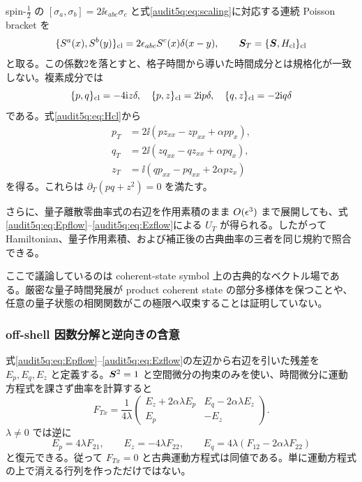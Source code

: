 spin-$\tfrac12$ の $[\sigma_a,\sigma_b]=2\ii\epsilon_{abc}\sigma_c$ と式\eqref{audit5q:eq:scaling}に対応する連続 Poisson bracket を
\begin{equation}
\{S^a(x),S^b(y)\}_{\rm cl}
=2\epsilon_{abc}S^c(x)\delta(x-y),\qquad
\boldsymbol S_T=\{\boldsymbol S,H_{\rm cl}\}_{\rm cl}
\label{audit5q:eq:Poisson}
\end{equation}
と取る。この係数2を落とすと、格子時間から導いた時間成分とは規格化が一致しない。複素成分では
\begin{equation}
\{p,q\}_{\rm cl}=-4\mathrm i z\delta,\quad
\{p,z\}_{\rm cl}=2\mathrm i p\delta,\quad
\{q,z\}_{\rm cl}=-2\mathrm i q\delta
\end{equation}
である。式\eqref{audit5q:eq:Hcl}から
\begin{align}
p_T&=2\ii(pz_{xx}-zp_{xx}+\alpha pp_x),\label{audit5q:eq:Epflow}\\
q_T&=2\ii(zq_{xx}-qz_{xx}+\alpha pq_x),\label{audit5q:eq:Eqflow}\\
z_T&=\ii(qp_{xx}-pq_{xx}+2\alpha pz_x)\label{audit5q:eq:Ezflow}
\end{align}
を得る。これらは $\partial_T(pq+z^2)=0$ を満たす。

さらに、量子離散零曲率式の右辺を作用素積のまま $O(\epsilon^3)$ まで展開しても、式\eqref{audit5q:eq:Epflow}--\eqref{audit5q:eq:Ezflow}による $U_T$ が得られる。したがって Hamiltonian、量子作用素積、および補正後の古典曲率の三者を同じ規約で照合できる。

ここで議論しているのは coherent-state symbol 上の古典的なベクトル場である。厳密な量子時間発展が product coherent state の部分多様体を保つことや、任意の量子状態の相関関数がこの極限へ収束することは証明していない。

\subsubsection{off-shell 因数分解と逆向きの含意}

式\eqref{audit5q:eq:Epflow}--\eqref{audit5q:eq:Ezflow}の左辺から右辺を引いた残差を $E_p,E_q,E_z$ と定義する。$\boldsymbol S^2=1$ と空間微分の拘束のみを使い、時間微分に運動方程式を課さず曲率を計算すると
\begin{equation}
F_{Tx}=\frac1{4\lambda}
\begin{pmatrix}
E_z+2\alpha\lambda E_p&E_q-2\alpha\lambda E_z\\
E_p&-E_z
\end{pmatrix}.
\label{audit5q:eq:offshell}
\end{equation}
$\lambda\ne0$ では逆に
\begin{equation}
E_p=4\lambda F_{21},\qquad E_z=-4\lambda F_{22},\qquad
E_q=4\lambda(F_{12}-2\alpha\lambda F_{22})
\end{equation}
と復元できる。従って $F_{Tx}=0$ と古典運動方程式は同値である。単に運動方程式の上で消える行列を作っただけではない。

